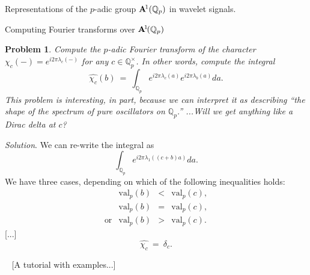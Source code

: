 \documentclass[letterpaper,11pt, reqno]{amsart}
\newtheorem{monodromy theorem}{Monodromy Theorem}[subsection]
\newtheorem{wild conjecture}[theorem]{Wild Conjecture}
\newtheorem{research objectives}{Research objectives}[subsection]
\newtheorem{research question}[theorem]{Research questions}
\newtheorem{aside question}[theorem]{Aside question}
\newtheorem{problem}[theorem]{Problem}
\newtheorem{audio example}[theorem]{\loudspeaker[3] Example}
\newtheorem{blank remark}[theorem]{}
\newtheorem{terminology and comment}[theorem]{Terminology and comment}
\newtheorem{purity hypothesis}[theorem]{Purity hypothesis}
\newtheorem{corollary of the purity hypothesis}[theorem]{Corollary of the purity hypothesis}
\newcommand{\QQ} {{\mathbb Q}}
\numberwithin{equation}{theorem}
\begin{document}
\begin{section}{Representations of the $p$-adic group $\bold{A}^{\!1}(\mathbb{Q}_{p})$ in wavelet signals.}
\begin{subsection}{Computing Fourier transforms over $\bold{A}^{\!1\!}(\QQ_{p})$}
\begin{problem}
\normalfont
Compute the $p$-adic Fourier transform of the character $\chi_{c}(-)=e^{i2\pi\lambda_{c}(-)}$ for any $c\in\QQ^\times_p$. In other words, compute the integral
	$$\widehat{\chi_c}(b)
	\ =\ 
	\int_{\QQ_{p}}\!\!\!e^{i2\pi\lambda_{c}(a)}e^{i2\pi\lambda_{b\!}(a)}da.
	$$
This problem is interesting, in part, because we can interpret it as describing ``the shape of the spectrum of pure oscillators on $\QQ_{p}$.'' ...Will we get anything like a Dirac delta at $c$?
\end{problem}

\noindent
{\em Solution}.
We can re-write the integral as
	$$
	\int_{\QQ_{p}}\!\!\!e^{i2\pi\lambda_{1\!}((c+b)a)}da.
	$$
We have three cases, depending on which of the following inequalities holds:
	$$
	\begin{array}{rrcl}
	& \text{val}_{p}(b) & \!\!<\!\! & \text{val}_{p}(c),
	\\[10pt]
	& \text{val}_{p}(b) & \!\!=\!\! & \text{val}_{p}(c),
	\\[10pt]
	\text{or}
	& \text{val}_{p}(b) & \!\!>\!\! & \text{val}_{p}(c).
	\end{array}
	$$
{\color{red} [...]}
	$$
	\widehat{\chi_{c}}
	\ =\ 
	\delta_{c}.
	$$


\ 
{\color{red} [A tutorial with examples...]}
\end{subsection}


\end{section}
\end{document}
